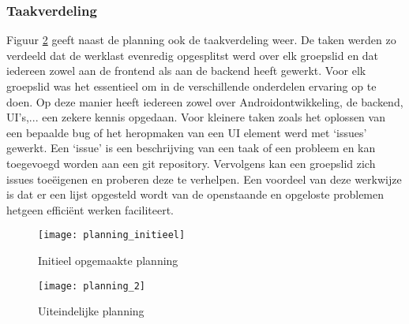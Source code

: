 \subsubsection{Taakverdeling}

Figuur \ref{fig:planning_uiteindelijk} geeft naast de planning ook de taakverdeling weer. De taken werden zo verdeeld dat de werklast evenredig opgesplitst werd over elk groepslid en dat iedereen zowel aan de frontend als aan de backend heeft gewerkt. Voor elk groepslid was het essentieel om in de verschillende onderdelen ervaring op te doen. Op deze manier heeft iedereen zowel over Androidontwikkeling, de backend, UI's,... een zekere kennis opgedaan. Voor kleinere taken zoals het oplossen van een bepaalde bug of het heropmaken van een UI element werd met `issues' gewerkt. Een `issue' is een beschrijving van een taak of een probleem en kan toegevoegd worden aan een git repository. Vervolgens kan een groepslid zich issues toeëigenen en proberen deze te verhelpen. Een voordeel van deze werkwijze is dat er een lijst opgesteld wordt van de openstaande en opgeloste problemen hetgeen efficiënt werken faciliteert.

\begin{figure}[H]
	\centering
	\texttt{[image: planning\_initieel]}
	\caption{Initieel opgemaakte planning}
	\label{fig:planning_initieel}
\end{figure}

\begin{figure}[H]
	\centering
	\texttt{[image: planning\_2]}
	\caption{Uiteindelijke planning}
	\label{fig:planning_uiteindelijk}
\end{figure}
